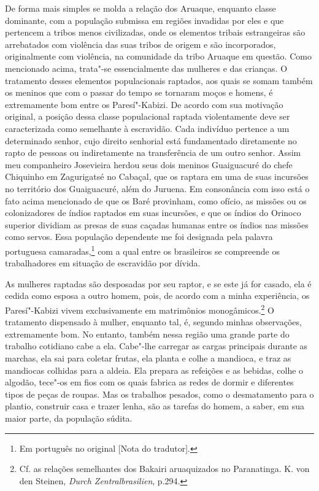De forma mais simples se molda a relação dos Aruaque, enquanto classe
dominante, com a população submissa em regiões invadidas por eles e que
pertencem a tribos menos civilizadas, onde os elementos tribais
estrangeiras são arrebatados com violência das suas tribos de origem e
são incorporados, originalmente com violência, na comunidade da tribo
Aruaque em questão. Como mencionado acima, trata"-se essencialmente das
mulheres e das crianças. O tratamento desses elementos populacionais
raptados, aos quais se somam também os meninos que com o passar do
tempo se tornaram moços e homens, é extremamente bom entre os
Paresí"-Kabizi. De acordo com sua motivação original, a posição dessa
classe populacional raptada violentamente deve ser caracterizada como
semelhante à escravidão. Cada indivíduo pertence a um determinado
senhor, cujo direito senhorial está fundamentado diretamente no rapto de
pessoas ou indiretamente na transferência de um outro senhor. Assim meu
companheiro Josevieira herdou seus dois meninos Guaiguacuré do chefe
Chiquinho em Zagurigatsé no Cabaçal, que os raptara em uma de suas
incursões no território dos Guaiguacuré, além do Juruena. Em consonância
com isso está o fato acima mencionado de que os Baré provinham, como
ofício, as missões ou os colonizadores de índios raptados em suas
incursões, e que os índios do Orinoco superior dividiam as presas de
suas caçadas humanas entre os índios nas missões como servos. Essa
população dependente me foi designada pela palavra portuguesa
camaradas,\footnote[*]{Em português no original {[}Nota do tradutor{]}.} com a qual entre os brasileiros se compreende os
trabalhadores em situação de escravidão por dívida.

As mulheres raptadas são desposadas por seu raptor, e se este já for
casado, ela é cedida como esposa a outro homem, pois, de acordo com a
minha experiência, os Paresí"-Kabizi vivem exclusivamente em matrimônios
monogâmicos.\footnote{Cf. as relações semelhantes dos Bakairi aruaquizados no Paranatinga.
  K. von den Steinen, \emph{Durch Zentralbrasilien}, p.294.} O
tratamento dispensado à mulher, enquanto tal, é, segundo minhas
observações, extremamente bom. No entanto, também nessa região uma
grande parte do trabalho cotidiano cabe a ela. Cabe"-lhe carregar as
cargas principais durante as marchas, ela sai para coletar frutas, ela
planta e colhe a mandioca, e traz as mandiocas colhidas para a aldeia.
Ela prepara as refeições e as bebidas, colhe o algodão, tece"-os em fios
com os quais fabrica as redes de dormir e diferentes tipos de peças de
roupas. Mas os trabalhos pesados, como o desmatamento para o plantio,
construir casa e trazer lenha, são as tarefas do homem, a saber, em sua
maior parte, da população súdita.

